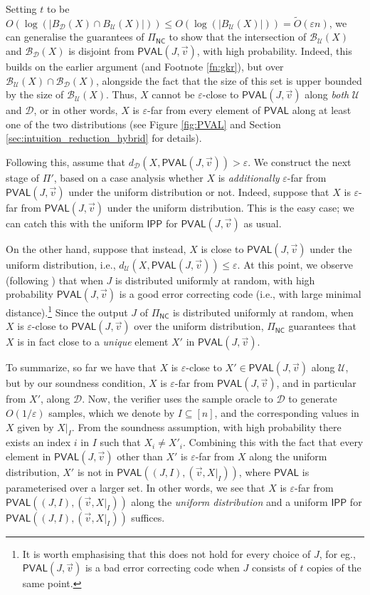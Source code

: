 \documentclass[11pt]{article}
\newcommand{\NC}{\mathsf{NC}}
\newcommand{\PVAL}{\mathsf{PVAL}}
\newcommand{\IPP}{\mathsf{IPP}}
\newcommand{\sU}{\mathcal{U}}
\newcommand{\sD}{\mathcal{D}}
\newcommand{\sB}{\mathcal{B}}
\newcommand{\eps}{\varepsilon}
\begin{document}
Setting $t$ to be $O(\log (\vert B_\sD (X) \cap B_\sU (X) \vert)) \leq O(\log(\vert B_\sU (X) \vert)) = \tilde{O}(\varepsilon n)$, we can generalise the guarantees of $\Pi_\NC$ to show that the intersection of $\sB_\sU(X)$ and $\sB_\sD(X)$ is disjoint from $\PVAL(J,\Vec{v})$, with high probability. Indeed, this builds on the earlier argument (and Footnote \ref{fn:gkr}), but over $\sB_\sU(X) \cap \sB_\sD(X)$, alongside the fact that the size of this set is upper bounded by the size of $\sB_\sU(X)$. Thus, $X$ cannot be $\varepsilon$-close to $\PVAL(J,\Vec{v})$ along \textit{both} $\sU$ and $\sD$, or in other words, $X$ is $\eps$-far from every element of $\PVAL$ along at least one of the two distributions (see Figure \ref{fig:PVAL} and Section \ref{sec:intuition_reduction_hybrid} for details).

Following this, assume that $d_\sD (X, \PVAL(J,\Vec{v})) > \varepsilon$. We construct the next stage of $\Pi'$, based on a case analysis whether $X$ is \textit{additionally} $\varepsilon$-far from $\PVAL(J,\Vec{v})$ under the uniform distribution or not. Indeed, suppose that $X$ is $\eps$-far from $\PVAL(J,\vec{v})$ under the uniform distribution. This is the easy case; we can catch this with the uniform $\IPP$ for $\PVAL(J,\Vec{v})$ as usual. 

On the other hand, suppose that instead, $X$ is close to $\PVAL(J,\Vec{v})$ under the uniform distribution, i.e., $d_\sU(X,\PVAL(J,\vec{v})) \leq \eps$. At this point, we observe (following \cite{RR20_batch_polylog}) that when $J$ is distributed uniformly at random, with high probability $\PVAL(J,\Vec{v})$ is a good error correcting code (i.e., with large minimal distance).\footnote{It is worth emphasising that this does not hold for every choice of $J$, for eg., $\PVAL(J,\Vec{v})$ is a bad error correcting code when $J$ consists of $t$ copies of the same point.} Since the output $J$ of $\Pi_\NC$ is distributed uniformly at random, when $X$ is $\varepsilon$-close to $\PVAL(J,\vec{v})$ over the uniform distribution, $\Pi_\NC$ guarantees that $X$ is in fact close to a \textit{unique} element $X'$ in $\PVAL(J,\Vec{v})$. 

To summarize, so far we have that $X$ is $\eps$-close to $X' \in \PVAL(J,\Vec{v})$ along $\sU$, but by our soundness condition, $X$ is $\eps$-far from $\PVAL(J,\Vec{v})$, and in particular from $X'$, along $\sD$. Now, the verifier uses the sample oracle to $\sD$ to generate $O(1/\varepsilon)$ samples, which we denote by $I\subseteq [n]$, and the corresponding values in $X$ given by $X \vert_I$. From the soundness assumption, with high probability there exists an index $i$ in $I$ such that $X_i \neq X'_i$. Combining this with the fact that every element in $\PVAL(J,\Vec{v})$ other than $X'$ is $\varepsilon$-far from $X$ along the uniform distribution, $X'$ is not in $\PVAL((J,I),(\Vec{v},X \vert_I))$, where $\PVAL$ is parameterised over a larger set. In other words, we see that $X$ is $\eps$-far from $\PVAL((J,I),(\Vec{v},X \vert_I))$ along the \textit{uniform distribution} and a uniform $\IPP$ for $\PVAL((J,I),(\Vec{v},X \vert_I))$ suffices.
\end{document}
